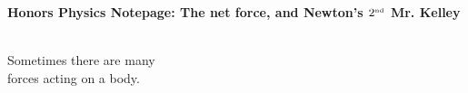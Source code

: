 \documentclass[12pt]{report}
\begin{document}
{\bf{Honors Physics} \hfill Notepage: The net force, and Newton's $2^{\mbox{\tiny nd}}$ \hfill {Mr. Kelley}} \\ \\

\vspace{1cm}

\hfill \parbox{6cm}{\centering Sometimes there are many \\ forces acting on a body.}  \hspace{5cm}

\vspace{1.5cm}
\end{document}
